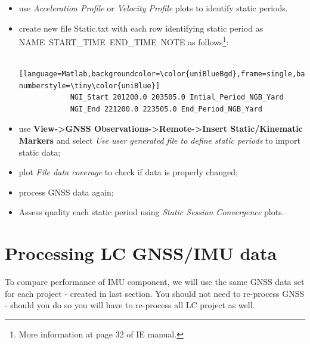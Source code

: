\documentclass[11pt,fleqn]{book} %
\begin{document}
\begin{itemize}
	\item use \emph{Acceleration Profile} or \emph{Velocity Profile} plots to identify static periods.
	\item create new file Static.txt with each row identifying static period as NAME~START\_TIME~END\_TIME~NOTE as follows\footnote{More information at page 32 of IE manual.}:

		\begin{lstlisting} [language=Matlab,backgroundcolor=\color{uniBlueBgd},frame=single,basicstyle=\footnotesize,numbers=left,numbersep=5pt, numberstyle=\tiny\color{uniBlue}]
			NGI_Start 201200.0 203505.0 Intial_Period_NGB_Yard
			NGI_End 221200.0 223505.0 End_Period_NGB_Yard
		\end{lstlisting}

	\item use \textbf{View->GNSS Observations->Remote->Insert Static/Kinematic Markers} and select \textit{Use user generated file to define static periods} to import static data;
	\item plot \textit{File data coverage} to check if data is properly changed;
	\item process GNSS data again;
	\item Assess quality each static period using \emph{Static Session Convergence} plots. 
\end{itemize}

\vspace{2cm}


\chapter{Processing LC GNSS/IMU data\label{sec:Processing-Loosely-Coupled}}

To compare performance of IMU component, we will use the same GNSS data set for each project - created in last section. You should not need to re-process GNSS - should you do so you will have to re-process all LC project as well.  
\end{document}
